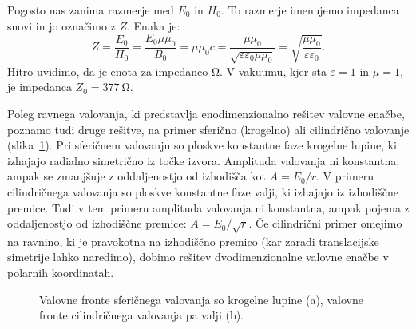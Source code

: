 Pogosto nas zanima razmerje med $E_0$ in $H_0$. To razmerje imenujemo impedanca
snovi in jo označimo z $Z$. Enaka je:
\begin{equation}
Z = \frac{E_0}{H_0} = \frac{E_0 \mu \mu_0}{B_0} = \mu \mu_0 c = 
\frac{\mu \mu_0}{\sqrt{\varepsilon \varepsilon_0 \mu \mu_0}} = \sqrt{\frac{\mu \mu_0}{\varepsilon \varepsilon_0}}.
\label{eq:03_25}
\end{equation}
Hitro uvidimo, da je enota za impedanco $\si{\ohm}$. V vakuumu, 
kjer sta $\varepsilon = 1$ in $\mu= 1$, je impedanca $Z_0 = 377~\si{\ohm}$.

\begin{remark}
Poleg ravnega valovanja, ki predstavlja enodimenzionalno rešitev valovne enačbe, poznamo
tudi druge rešitve, na primer sferično (krogelno)
 ali 
cilindrično valovanje (slika~\ref{fig:03_sfericnival}). 
Pri
sferičnem valovanju so ploskve konstantne faze krogelne lupine, ki izhajajo radialno 
simetrično iz točke izvora. Amplituda valovanja ni konstantna, ampak se zmanjšuje z oddaljenostjo 
od izhodišča kot $A = E_0/r$. V primeru cilindričnega valovanja so ploskve konstantne
faze valji, ki izhajajo iz izhodiščne premice. Tudi v tem primeru amplituda valovanja ni konstantna,
ampak pojema z oddaljenostjo od izhodiščne premice: $A = E_0/\sqrt{r}$.  Če cilindrični 
primer omejimo na ravnino, ki je pravokotna na izhodiščno premico (kar zaradi 
translacijske simetrije lahko naredimo), dobimo rešitev dvodimenzionalne valovne enačbe 
v polarnih koordinatah. 
\begin{figure}[ht]
\centering
\def\svgwidth{100truemm} 

\caption{Valovne fronte sferičnega valovanja so krogelne lupine (a), valovne fronte
cilindričnega valovanja pa valji (b).}
\label{fig:03_sfericnival}
\end{figure}
\end{remark}

